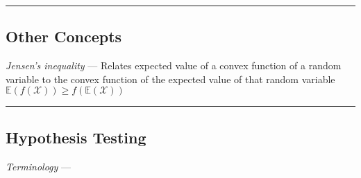 {\color{black}\hrule height 0.001mm}

\subsection*{Other Concepts}
\emph{Jensen's inequality} --- Relates expected value of a convex function of a random variable to the convex function of the expected value of that random variable\\
$\mathbb{E}(f(\mathcal{X})) \geq f(\mathbb{E}(\mathcal{X}))$

{\color{black}\hrule height 0.001mm}

\subsection*{Hypothesis Testing}
\emph{Terminology} ---
